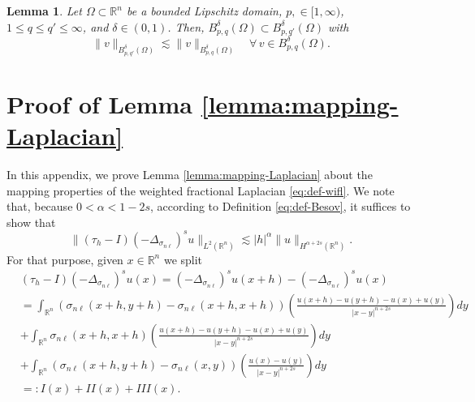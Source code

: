 \documentclass{amsart}
\newcommand{\snl}{{\sigma_{n\ell}}}
\def\R{{\mathbb R}}
\theoremstyle{plain}
\newtheorem{lemma}{Lemma}
\numberwithin{equation}{section}
\numberwithin{table}{section}
\numberwithin{figure}{section}
\numberwithin{theorem}{section}
\numberwithin{corollary}{section}
\numberwithin{definition}{section}
\numberwithin{lemma}{section}
\numberwithin{proposition}{section}
\numberwithin{remark}{section}
\begin{document}
\begin{lemma}
Let $\Omega \subset \R^n$ be a bounded Lipschitz domain, $p, \in [1,\infty)$, $1 \le q \le q' \le \infty$, and $\delta\in (0,1)$. Then, $B^{\delta}_{p,q}(\Omega) \subset B^{\delta}_{p,q'} (\Omega)$ with 
\begin{equation}\label{eq:Besov-Besov-emb}
\|v\|_{ B^{\delta}_{p,q'}(\Omega)} \lesssim  \|v\|_{B^{\delta}_{p,q}(\Omega)}  \quad\forall \, v\in B^{\delta}_{p,q}(\Omega).
\end{equation}
\end{lemma}

\section{Proof of Lemma \ref{lemma:mapping-Laplacian}} \label{sec:mapping-Laplacian}
In this appendix, we prove Lemma \ref{lemma:mapping-Laplacian} about the mapping properties of the weighted fractional Laplacian \eqref{eq:def-wifl}.
%
We note that, because $0<\alpha < 1-2s$, according to Definition \eqref{eq:def-Besov}, it suffices to show that 
\begin{equation} \label{eq:mapping-Laplacian}
\| (\tau_h - I) (-\Delta_\snl)^s u \|_{L^2(\R^n)} \lesssim |h|^{\alpha}  \| u \|_{H^{\alpha+2s}(\R^n)}.
\end{equation}
For that purpose, given $x \in \R^n$ we split
\small{\begin{equation} \label{eq:split-translation-Laplacian}
\begin{split}
& (\tau_h - I) (-\Delta_\snl)^s u (x) = (-\Delta_\snl)^s u (x+h) - (-\Delta_\snl)^s u (x) \\
& =  \! \int_{\R^n} ( \snl(x+h, y+h) - \snl(x+h, x+h) ) \left( \frac{u(x+h) - u(y+h) - u(x) + u(y)}{|x-y|^{n+2s}} \right)  dy \\ 
& +  \int_{\R^n} \snl(x+h, x+h) \left( \frac{u(x+h) - u(y+h) - u(x) + u(y)}{|x-y|^{n+2s}} \right) dy \\ 
& +  \int_{\R^n} \left( \snl(x+h, y+h) -  \snl(x, y) \right) \left( \frac{u(x) - u(y)}{|x-y|^{n+2s}} \right) dy \\ 
& =: I(x) + II(x) + III(x) .
\end{split}
\end{equation}}
\end{document}
